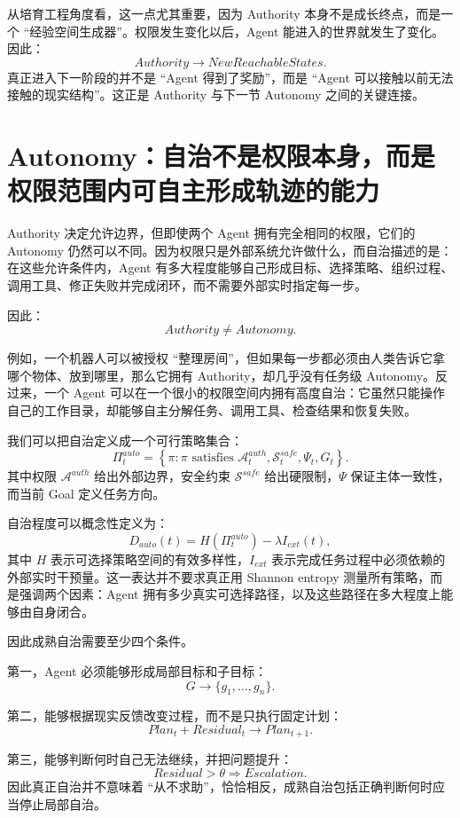从培育工程角度看，这一点尤其重要，因为 Authority 本身不是成长终点，而是一个 ``经验空间生成器''。权限发生变化以后，Agent 能进入的世界就发生了变化。因此：
\[
Authority
\rightarrow
NewReachableStates.
\]
真正进入下一阶段的并不是 ``Agent 得到了奖励''，而是 ``Agent 可以接触以前无法接触的现实结构''。这正是 Authority 与下一节 Autonomy 之间的关键连接。

\section{Autonomy：自治不是权限本身，而是权限范围内可自主形成轨迹的能力}

Authority 决定允许边界，但即使两个 Agent 拥有完全相同的权限，它们的 Autonomy 仍然可以不同。因为权限只是外部系统允许做什么，而自治描述的是：在这些允许条件内，Agent 有多大程度能够自己形成目标、选择策略、组织过程、调用工具、修正失败并完成闭环，而不需要外部实时指定每一步。

因此：
\[
\boxed{
Authority\neq Autonomy.
}
\]

例如，一个机器人可以被授权 ``整理房间''，但如果每一步都必须由人类告诉它拿哪个物体、放到哪里，那么它拥有 Authority，却几乎没有任务级 Autonomy。反过来，一个 Agent 可以在一个很小的权限空间内拥有高度自治：它虽然只能操作自己的工作目录，却能够自主分解任务、调用工具、检查结果和恢复失败。

我们可以把自治定义成一个可行策略集合：
\[
\Pi_t^{auto}
=
\left\{
\pi:
\pi
\text{ satisfies }
\mathcal A_t^{auth},
\mathcal S_t^{safe},
\Psi_t,
G_t
\right\}.
\]
其中权限 $\mathcal A^{auth}$ 给出外部边界，安全约束 $\mathcal S^{safe}$ 给出硬限制，$\Psi$ 保证主体一致性，而当前 Goal 定义任务方向。

自治程度可以概念性定义为：
\[
D_{auto}(t)
=
H(
\Pi_t^{auto}
)
-
\lambda I_{ext}(t),
\]
其中 $H$ 表示可选择策略空间的有效多样性，$I_{ext}$ 表示完成任务过程中必须依赖的外部实时干预量。这一表达并不要求真正用 Shannon entropy 测量所有策略，而是强调两个因素：Agent 拥有多少真实可选择路径，以及这些路径在多大程度上能够由自身闭合。

因此成熟自治需要至少四个条件。

第一，Agent 必须能够形成局部目标和子目标：
\[
G
\rightarrow
\{g_1,\ldots,g_n\}.
\]

第二，能够根据现实反馈改变过程，而不是只执行固定计划：
\[
Plan_t
+
Residual_t
\rightarrow
Plan_{t+1}.
\]

第三，能够判断何时自己无法继续，并把问题提升：
\[
Residual>\theta
\Rightarrow
Escalation.
\]
因此真正自治并不意味着 ``从不求助''，恰恰相反，成熟自治包括正确判断何时应当停止局部自治。

